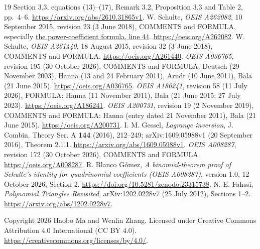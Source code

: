 \documentclass[11pt]{article}
\begin{document}
\begin{thebibliography}{19}
Section 3.3, equations (13)--(17), Remark 3.2, Proposition 3.3
and Table 2, pp.~4--6.
\url{https://arxiv.org/abs/2610.31865v1}.
 W. Schulte, \emph{OEIS A262082}, 10 September 2015,
revision 23 (3 June 2018), COMMENTS and FORMULA, especially
\href{https://github.com/oeis/oeisdata/blob/49db7744e1fdbefbe376d1d018370c017d4c288b/seq/A262/A262082.seq#L44}{the power-coefficient formula, line 44}.
\url{https://oeis.org/A262082}.
 W. Schulte, \emph{OEIS A261440}, 18 August 2015,
revision 32 (3 June 2018), COMMENTS and FORMULA.
\url{https://oeis.org/A261440}.
 \emph{OEIS A036765}, revision 195 (30 October 2026),
COMMENTS and FORMULA: Deutsch (29 November 2003), Hanna (13 and
24 February 2011), Arndt (10 June 2011), Bala (21 June 2015).
\url{https://oeis.org/A036765}.
 \emph{OEIS A186241}, revision 58 (11 July 2026),
FORMULA: Hanna (11 November 2011), Bala (21 June 2015; 27 July 2023).
\url{https://oeis.org/A186241}.
 \emph{OEIS A200731}, revision 19 (2 November 2019),
COMMENTS and FORMULA: Hanna (entry dated 21 November 2011),
Bala (21 June 2015).
\url{https://oeis.org/A200731}.
 I. M. Gessel, \emph{Lagrange inversion},
J. Combin. Theory Ser. A \textbf{144} (2016), 212--249;
arXiv:1609.05988v1 (20 September 2016), Theorem 2.1.1.
\url{https://arxiv.org/abs/1609.05988v1}.
 \emph{OEIS A008287}, revision 172
(30 October 2026), COMMENTS and FORMULA.
\url{https://oeis.org/A008287}.
 R. Blanco G\'omez,
\emph{A binomial-theorem proof of Schulte's identity for quadrinomial
coefficients (OEIS A008287)}, version 1.0, 12 October 2026, Section 2.
\url{https://doi.org/10.5281/zenodo.23315738}.
 N.-E. Fahssi, \emph{Polynomial Triangles Revisited},
arXiv:1202.0228v7 (25 July 2012), Sections 1--2.
\url{https://arxiv.org/abs/1202.0228v7}.
\end{thebibliography}
\noindent\small Copyright 2026 Haobo Ma and Wenlin Zhang.
Licensed under Creative Commons Attribution 4.0 International (CC BY 4.0).
\url{https://creativecommons.org/licenses/by/4.0/}.
\end{document}

